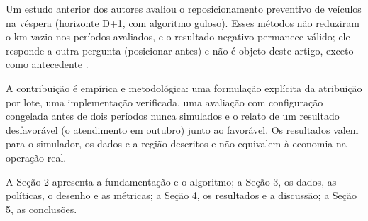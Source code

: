 Um estudo anterior dos autores avaliou o reposicionamento preventivo de veículos na véspera (horizonte D+1, com algoritmo guloso). Esses métodos não reduziram o km vazio nos períodos avaliados, e o resultado negativo permanece válido; ele responde a outra pergunta (posicionar antes) e não é objeto deste artigo, exceto como antecedente \cite{pavone2012, kontou2020, pouls2025}.

A contribuição é empírica e metodológica: uma formulação explícita da atribuição por lote, uma implementação verificada, uma avaliação com configuração congelada antes de dois períodos nunca simulados e o relato de um resultado desfavorável (o atendimento em outubro) junto ao favorável. Os resultados valem para o simulador, os dados e a região descritos e não equivalem à economia na operação real.

A Seção 2 apresenta a fundamentação e o algoritmo; a Seção 3, os dados, as políticas, o desenho e as métricas; a Seção 4, os resultados e a discussão; a Seção 5, as conclusões.
